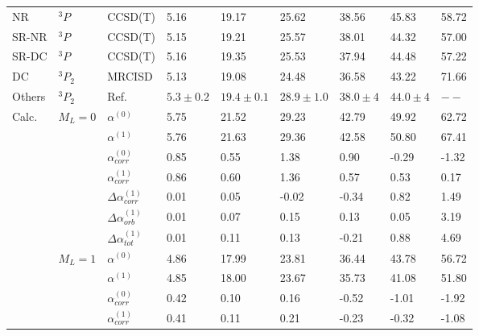 \begin{longtable}{lllllllll}
\bottomrule
\endlastfoot
NR & $^3P$ & CCSD(T) &         5.16 &         19.17 &         25.62 &       38.56 &       45.83 & 58.72 \\
SR-NR & $^3P$ & CCSD(T) &         5.15 &         19.21 &         25.57 &       38.01 &       44.32 & 57.00 \\
SR-DC & $^3P$ & CCSD(T) &         5.16 &         19.35 &         25.53 &       37.94 &       44.48 & 57.22 \\
DC & $^3P_2$ & MRCISD &         5.13 &         19.08 &         24.48 &       36.58 &       43.22 & 71.66 \\
Others & $^3P_2$ & Ref. \cite{Schwerdtfeger2019} &  $5.3\pm0.2$ &  $19.4\pm0.1$ &  $28.9\pm1.0$ &  $38.0\pm4$ &  $44.0\pm4$ &  $--$ \\
Calc. & $M_L=0$ & $\alpha^{(0)}$ &         5.75 &         21.52 &         29.23 &       42.79 &       49.92 & 62.72 \\
      &       & $\alpha^{(1)}$ &         5.76 &         21.63 &         29.36 &       42.58 &       50.80 & 67.41 \\
      &       & $\alpha_{corr}^{(0)}$ &         0.85 &          0.55 &          1.38 &        0.90 &       -0.29 & -1.32 \\
      &       & $\alpha_{corr}^{(1)}$ &         0.86 &          0.60 &          1.36 &        0.57 &        0.53 &  0.17 \\
      &       & $\Delta \alpha_{corr}^{(\text{1})}$ &         0.01 &          0.05 &         -0.02 &       -0.34 &        0.82 &  1.49 \\
      &       & $\Delta \alpha_{orb}^{(\text{1})}$ &         0.01 &          0.07 &          0.15 &        0.13 &        0.05 &  3.19 \\
      &       & $\Delta \alpha_{tot}^{(\text{1})}$ &         0.01 &          0.11 &          0.13 &       -0.21 &        0.88 &  4.69 \\
      & $M_L=1$ & $\alpha^{(0)}$ &         4.86 &         17.99 &         23.81 &       36.44 &       43.78 & 56.72 \\
      &       & $\alpha^{(1)}$ &         4.85 &         18.00 &         23.67 &       35.73 &       41.08 & 51.80 \\
      &       & $\alpha_{corr}^{(0)}$ &         0.42 &          0.10 &          0.16 &       -0.52 &       -1.01 & -1.92 \\
      &       & $\alpha_{corr}^{(1)}$ &         0.41 &          0.11 &          0.21 &       -0.23 &       -0.32 & -1.08 \\

\end{longtable}

